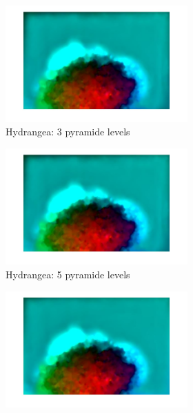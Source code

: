 \documentclass[10pt,twocolumn,letterpaper]{article}
\begin{document}
\begin{figure}
\begin{figure}[t]
	\centering
	\begin{subfigure}[b]{0.3\textwidth}
		\includegraphics[width=\textwidth] {hydragea_3levels.jpg}
		\caption{Hydrangea: 3 pyramide levels}
		\label{fig:hydragea3}
	\end{subfigure}\hfill
	\begin{subfigure}[b]{0.3\textwidth}
		\includegraphics[width=\textwidth] {hydragea_5levels.jpg} 
		\caption{Hydrangea: 5 pyramide levels}
		\label{fig:hydrangea5}
	\end{subfigure}\hfill
	\begin{subfigure}[b]{0.3\textwidth}
		\includegraphics[width=\textwidth] {hydragea_6levels.jpg} 

\end{subfigure}
\end{figure}
\end{figure}
\end{document}
